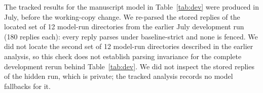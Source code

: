 \begin{table}[h]
\centering\footnotesize\setlength{\tabcolsep}{4pt}
\caption{Accuracy of cells A, D, E, B and B+g (defined in Table~\ref{tab:models-acc}) under json-fence-tolerant (tolerant) and baseline-strict (strict) parsing, and the number of replies that baseline-strict rejects (of all replies for the configuration).}
\label{tab:parser}

\end{table}
The tracked results for the manuscript model in Table~\ref{tab:dev} were produced in July, before the working-copy change. We re-parsed the stored replies of the located set of 12 model-run directories from the earlier July development run (180 replies each): every reply parses under baseline-strict and none is fenced. We did not locate the second set of 12 model-run directories described in the earlier analysis, so this check does not establish parsing invariance for the complete development rerun behind Table~\ref{tab:dev}. We did not inspect the stored replies of the hidden run, which is private; the tracked analysis records no model fallbacks for it.
